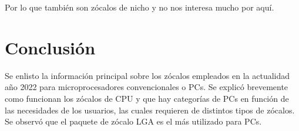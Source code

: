\documentclass[conference]{IEEEtran}
\begin{document}
    \bigbreak

    Por lo que también son zócalos de nicho y no nos interesa mucho por aquí.

    \section{Conclusión}

    Se enlisto la información principal sobre los zócalos empleados en la
    actualidad año 2022 para microprocesadores convencionales o PCs. Se
    explicó brevemente como funcionan los zócalos de CPU y que hay categorías
    de PCs en función de las necesidades de los usuarios, las cuales
    requieren de distintos tipos de zócalos. Se observó que el paquete de
    zócalo LGA es el más utilizado para PCs.

    \printbibliography
\end{document}
